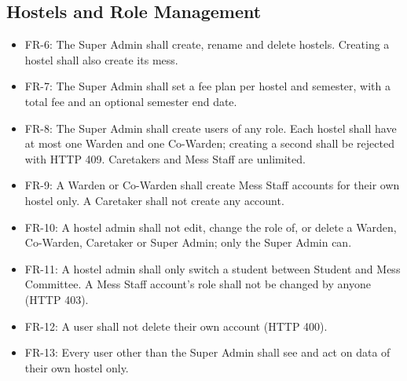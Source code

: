 \documentclass{scrreprt}
\begin{document}
\subsection{Hostels and Role Management}
\begin{itemize}
    \item FR-6: The Super Admin shall create, rename and delete hostels.
    Creating a hostel shall also create its mess.
    \item FR-7: The Super Admin shall set a fee plan per hostel and semester,
    with a total fee and an optional semester end date.
    \item FR-8: The Super Admin shall create users of any role. Each hostel
    shall have at most one Warden and one Co-Warden; creating a second shall
    be rejected with HTTP 409. Caretakers and Mess Staff are unlimited.
    \item FR-9: A Warden or Co-Warden shall create Mess Staff accounts for
    their own hostel only. A Caretaker shall not create any account.
    \item FR-10: A hostel admin shall not edit, change the role of, or delete
    a Warden, Co-Warden, Caretaker or Super Admin; only the Super Admin can.
    \item FR-11: A hostel admin shall only switch a student between Student
    and Mess Committee. A Mess Staff account's role shall not be changed by
    anyone (HTTP 403).
    \item FR-12: A user shall not delete their own account (HTTP 400).
    \item FR-13: Every user other than the Super Admin shall see and act on
    data of their own hostel only.
\end{itemize}
\end{document}
